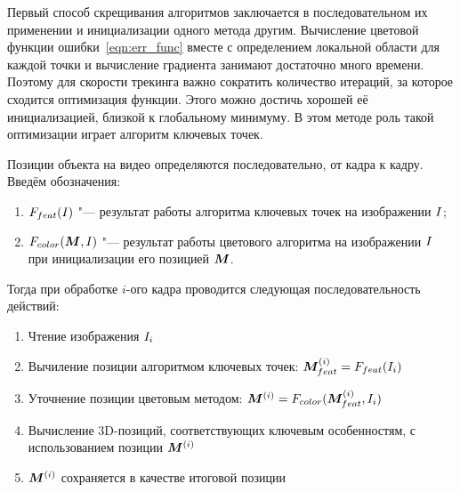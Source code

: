 
Первый способ скрещивания алгоритмов заключается в последовательном их
применении и инициализации одного метода другим.
Вычисление цветовой функции ошибки~\ref{eqn:err_func} вместе с определением
локальной области для каждой точки и вычисление градиента занимают достаточно
много времени.
Поэтому для скорости трекинга важно сократить количество итераций, за которое
сходится оптимизация функции.
Этого можно достичь хорошей её инициализацией, близкой к глобальному
минимуму.
В этом методе роль такой оптимизации играет алгоритм ключевых точек.

\newcommand{\FeatAlg}{\ensuremath{F_{feat}}}
\newcommand{\ColorAlg}{\ensuremath{F_{color}}}
\newcommand{\PoseOnFrame}[1]{\ensuremath{\Pose^{\left( #1 \right)}}}
\newcommand{\PoseI}{\ensuremath{\PoseOnFrame{i}}}
\newcommand{\FeatPoseI}{\ensuremath{\PoseI_{feat}}}
\newcommand{\FeatPose}{\ensuremath{\Pose_{feat}}}

\newcommand{\XOld}{\ensuremath{\homv{x_{old}}}}
\newcommand{\XNew}{\ensuremath{\homv{x_{new}}}}
\newcommand{\ReprErr}[1]{\ensuremath{\homv{e}( #1 )}}

Позиции объекта на видео определяются последовательно, от кадра к кадру.
Введём обозначения:

\begin{enumerate}
\item $\FeatAlg(\Img)$ "--- результат работы алгоритма ключевых точек на
изображении $I$;
\item $\ColorAlg(\Pose, \Img)$ "--- результат работы цветового алгоритма на
изображении $I$
при инициализации его позицией $\bm{M}$.
\end{enumerate}

Тогда при обработке $i$-ого кадра проводится следующая последовательность
действий:

\begin{enumerate}
\item Чтение изображения $I_i$
\item Вычиление позиции алгоритмом ключевых точек:
    $\FeatPoseI = \FeatAlg(\Img_i)$
\item Уточнение позиции цветовым методом:
    $\PoseI = \ColorAlg(\FeatPoseI, \Img_i)$
\item Вычисление  3D-позиций, соответствующих ключевым особенностям, с
    использованием позиции $\PoseI$
\item $\PoseI$ сохраняется в качестве итоговой позиции
\end{enumerate}

